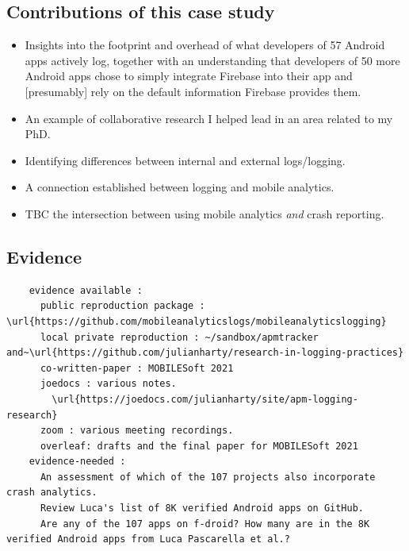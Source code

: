 \subsection*{Contributions of this case study}
\begin{itemize}
    \item Insights into the footprint and overhead of what developers of 57 Android apps actively log, together with an understanding that developers of 50 more Android apps chose to simply integrate Firebase into their app and [presumably] rely on the default information Firebase provides them.
    \item An example of collaborative research I helped lead in an area related to my PhD.
    \item Identifying differences between internal and external logs/logging.
    \item A connection established between logging and mobile analytics.
    \item TBC the intersection between using mobile analytics \textit{and} crash reporting.
\end{itemize}



\subsection*{Evidence}
  \begin{verbatim}
    evidence available :
      public reproduction package : \url{https://github.com/mobileanalyticslogs/mobileanalyticslogging}
      local private reproduction : ~/sandbox/apmtracker and~\url{https://github.com/julianharty/research-in-logging-practices}
      co-written-paper : MOBILESoft 2021
      joedocs : various notes.
        \url{https://joedocs.com/julianharty/site/apm-logging-research}
      zoom : various meeting recordings.
      overleaf: drafts and the final paper for MOBILESoft 2021
    evidence-needed : 
      An assessment of which of the 107 projects also incorporate crash analytics.
      Review Luca's list of 8K verified Android apps on GitHub.
      Are any of the 107 apps on f-droid? How many are in the 8K verified Android apps from Luca Pascarella et al.?
  \end{verbatim}  

